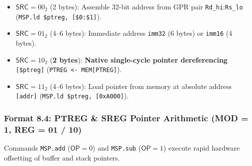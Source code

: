 \documentclass[11pt,a4paper]{article}
\newcommand{\reg}[1]{\texttt{#1}}
\newcommand{\field}[1]{\textsf{#1}}
\begin{document}
\begin{itemize}
  \item $\field{SRC} = 00_2$ (2 bytes): Assemble 32-bit address from GPR pair \reg{Rd\_hi}:\reg{Rs\_lo} (\texttt{MSP.ld \$ptreg, [\$0:\$1]}).
  \item $\field{SRC} = 01_2$ (4--6 bytes): Immediate address \texttt{imm32} (6 bytes) or \texttt{imm16} (4 bytes).
  \item $\field{SRC} = 10_2$ (\textbf{2 bytes}): \textbf{Native single-cycle pointer dereferencing} \texttt{[\$ptreg]} (\texttt{PTREG <- MEM[PTREG]}).
  \item $\field{SRC} = 11_2$ (4--6 bytes): Load pointer from memory at absolute address \texttt{[addr]} (\texttt{MSP.ld \$ptreg, [0xA000]}).
\end{itemize}

\subsubsection{Format 8.4: PTREG \& SREG Pointer Arithmetic (MOD = 1, REG = 01 / 10)}
Commands \texttt{MSP.add} ($\field{OP}=0$) and \texttt{MSP.sub} ($\field{OP}=1$) execute rapid hardware offsetting of buffer and stack pointers.
\end{document}
